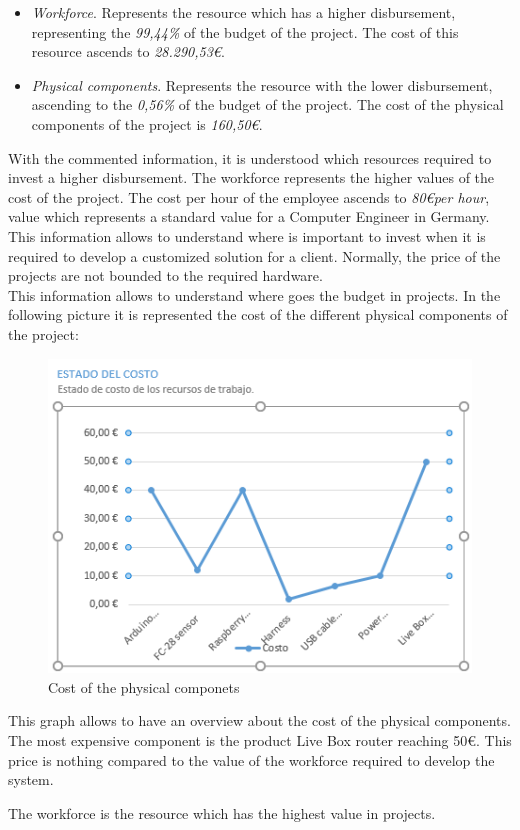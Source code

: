 \begin{itemize}

\item \textit{Workforce}. Represents the resource which has a higher disbursement, representing the \textit{99,44\%} of the budget of the project. The cost of this resource ascends to \textit{28.290,53\euro}.

\item \textit{Physical components}. Represents the resource with the lower disbursement, ascending to the \textit{0,56\%} of the budget of the project. The cost of the physical components of the project is \textit{160,50\euro}.

\end{itemize}

With the commented information, it is understood which resources required to invest a higher disbursement. The workforce represents the higher values of the cost of the project. The cost per hour of the employee ascends to \textit{80\euro per hour}, value which represents a standard value for a Computer Engineer in Germany. This information allows to understand where is important to invest when it is required to develop a customized solution for a client. Normally, the price of the projects are not bounded to the required hardware.\\

This information allows to understand where goes the budget in projects. In the following picture it is represented the cost of the different physical components of the project:

\begin{figure}[H]
\begin{centering}
\includegraphics[scale=1]{IMGS/cost_materials.PNG}
\caption{Cost of the physical componets \label{Cost of the physical componets}}
\end{centering}
\end{figure}

This graph allows to have an overview about the cost of the physical components. The most expensive component is the product Live Box router reaching 50\euro. This price is nothing compared to the value of the workforce required to develop the system.

The workforce is the resource which has the highest value in projects.

\newpage
\newpage